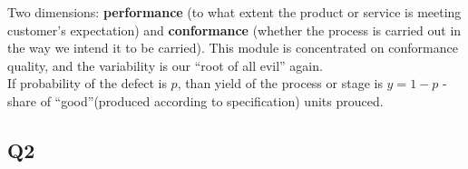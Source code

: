 \documentclass{scrartcl}
\begin{document}
Two dimensions: {\bf performance} (to what extent the product or service is meeting customer's expectation) and {\bf conformance} (whether the process is carried out in the way we intend it to be carried). This module is concentrated on conformance quality, and the variability is our ``root of all evil'' again.\\

If probability of the defect is $p$, than yield of the process or stage is $y = 1 - p$ - share of ``good''(produced according to specification) units prouced.

\subsection{Q2}
\label{sec:07-02}
\end{document}
